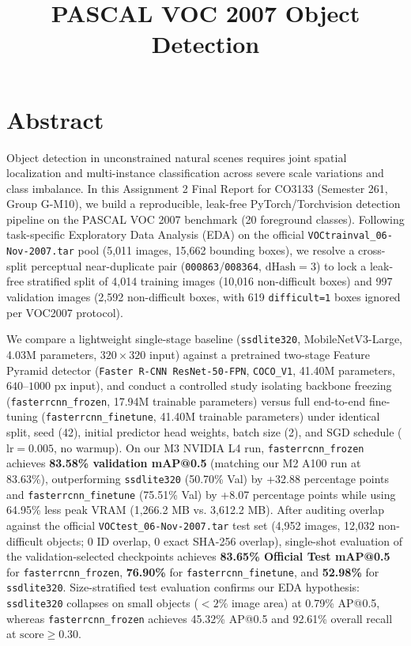\documentclass[twoside,final]{hcmut-report}
\title{PASCAL VOC 2007 Object Detection}
\begin{document}
\coverpage

\section*{Abstract}
Object detection in unconstrained natural scenes requires joint spatial localization and multi-instance classification across severe scale variations and class imbalance. In this Assignment 2 Final Report for CO3133 (Semester 261, Group G-M10), we build a reproducible, leak-free PyTorch/Torchvision detection pipeline on the PASCAL VOC 2007 benchmark (20 foreground classes). Following task-specific Exploratory Data Analysis (EDA) on the official \texttt{VOCtrainval\_06-Nov-2007.tar} pool (5,011 images, 15,662 bounding boxes), we resolve a cross-split perceptual near-duplicate pair (\texttt{000863}/\texttt{008364}, $\text{dHash}=3$) to lock a leak-free stratified split of 4,014 training images (10,016 non-difficult boxes) and 997 validation images (2,592 non-difficult boxes, with 619 \texttt{difficult=1} boxes ignored per VOC2007 protocol).

We compare a lightweight single-stage baseline (\texttt{ssdlite320}, MobileNetV3-Large, 4.03M parameters, $320\times320$ input) against a pretrained two-stage Feature Pyramid detector (\texttt{Faster R-CNN ResNet-50-FPN}, \texttt{COCO\_V1}, 41.40M parameters, $640\text{--}1000\text{ px}$ input), and conduct a controlled study isolating backbone freezing (\texttt{fasterrcnn\_frozen}, 17.94M trainable parameters) versus full end-to-end fine-tuning (\texttt{fasterrcnn\_finetune}, 41.40M trainable parameters) under identical split, seed (42), initial predictor head weights, batch size (2), and SGD schedule ($\text{lr}=0.005$, no warmup). On our M3 NVIDIA L4 run, \texttt{fasterrcnn\_frozen} achieves \textbf{83.58\% validation mAP@0.5} (matching our M2 A100 run at 83.63\%), outperforming \texttt{ssdlite320} (50.70\% Val) by +32.88 percentage points and \texttt{fasterrcnn\_finetune} (75.51\% Val) by +8.07 percentage points while using 64.95\% less peak VRAM (1,266.2 MB vs. 3,612.2 MB). After auditing overlap against the official \texttt{VOCtest\_06-Nov-2007.tar} test set (4,952 images, 12,032 non-difficult objects; 0 ID overlap, 0 exact SHA-256 overlap), single-shot evaluation of the validation-selected checkpoints achieves \textbf{83.65\% Official Test mAP@0.5} for \texttt{fasterrcnn\_frozen}, \textbf{76.90\%} for \texttt{fasterrcnn\_finetune}, and \textbf{52.98\%} for \texttt{ssdlite320}. Size-stratified test evaluation confirms our EDA hypothesis: \texttt{ssdlite320} collapses on small objects ($<2\%$ image area) at 0.79\% AP@0.5, whereas \texttt{fasterrcnn\_frozen} achieves 45.32\% AP@0.5 and 92.61\% overall recall at $\text{score}\ge 0.30$.
\end{document}
